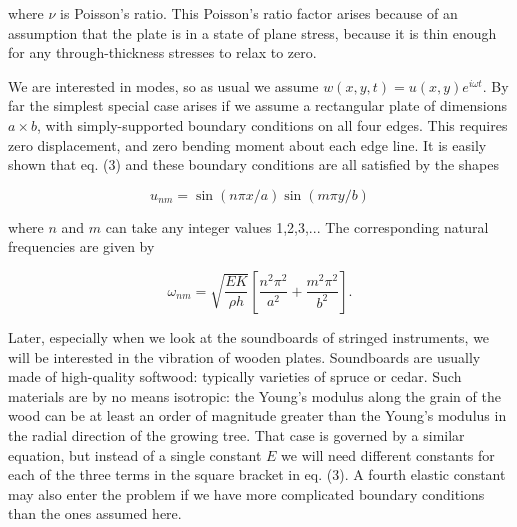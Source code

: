   \noindent{}where $\nu$ is Poisson's ratio. This Poisson's ratio factor arises 
  because of an assumption that the plate is in a state of plane stress, 
  because it is thin enough for any through-thickness stresses to relax to 
  zero. 

  We are interested in modes, so as usual we assume $w(x,y,t)=u(x,y) e^{i 
  \omega t}$. By far the simplest special case arises if we assume a 
  rectangular plate of dimensions $a \times b$, with simply-supported boundary 
  conditions on all four edges. This requires zero displacement, and zero 
  bending moment about each edge line. It is easily shown that eq. (3) and 
  these boundary conditions are all satisfied by the shapes 

  \begin{equation*}u_{nm}=\sin(n \pi x/a) \sin(m \pi y/b) 
  \tag{5}\end{equation*} 

  \noindent{}where $n$ and $m$ can take any integer values 1,2,3,... The 
  corresponding natural frequencies are given by 

  \begin{equation*}\omega_{nm} = \sqrt{\frac{EK}{\rho h}} \left[\frac{n^2 
  \pi^2}{a^2}+\frac{m^2 \pi^2}{b^2} \right] .\tag{6}\end{equation*} 

  Later, especially when we look at the soundboards of stringed instruments, we 
  will be interested in the vibration of wooden plates. Soundboards are usually 
  made of high-quality softwood: typically varieties of spruce or cedar. Such 
  materials are by no means isotropic: the Young's modulus along the grain of 
  the wood can be at least an order of magnitude greater than the Young's 
  modulus in the radial direction of the growing tree. That case is governed by 
  a similar equation, but instead of a single constant $E$ we will need 
  different constants for each of the three terms in the square bracket in eq. 
  (3). A fourth elastic constant may also enter the problem if we have more 
  complicated boundary conditions than the ones assumed here. 